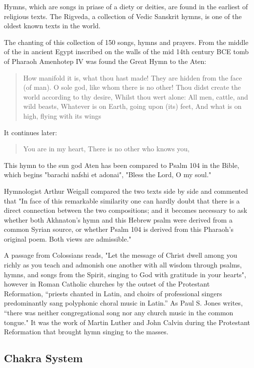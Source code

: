 \documentclass[12pt]{article}
\begin{document}
Hymns, which are songs in priase of a diety or deities, are found in the earliest of religious texts. The Rigveda, a collection of Vedic Sanskrit hymns, is one of the oldest known texts in the world.

The chanting of this collection of 150 songs, hymns and prayers. From the middle of the in ancient Egypt inscribed on the walls of the mid 14th century BCE tomb of Pharaoh Amenhotep IV was found the Great Hymn to the Aten:

\begin{quote}
How manifold it is, what thou hast made!
They are hidden from the face (of man).
O sole god, like whom there is no other!
Thou didst create the world according to thy desire,
Whilst thou wert alone: All men, cattle, and wild beasts,
Whatever is on Earth, going upon (its) feet,
And what is on high, flying with its wings
\end{quote}

It continues later:

\begin{quote}
You are in my heart,
There is no other who knows you,
\end{quote}

This hymn to the sun god Aten has been compared to Psalm 104 in the Bible, which begins "barachi nafshi et adonai", "Bless the Lord, O my soul."

Hymnologist Arthur Weigall compared the two texts side by side and commented that "In face of this remarkable similarity one can hardly doubt that there is a direct connection between the two compositions; and it becomes necessary to ask whether both Akhnaton's hymn and this Hebrew psalm were derived from a common Syrian source, or whether Psalm 104 is derived from this Pharaoh's original poem. Both views are admissible."

A passage from Colossians reads, "Let the message of Christ dwell among you richly as you teach and admonish one another with all wisdom through psalms, hymns, and songs from the Spirit, singing to God with gratitude in your hearts", however in Roman Catholic churches by the outset of the Protestant Reformation, “priests chanted in Latin, and choirs of professional singers predominantly sang polyphonic choral music in Latin.” As Paul S. Jones writes, “there was neither congregational song nor any church music in the common tongue." It was the work of Martin Luther and John Calvin during the Protestant Reformation that brought hymn singing to the masses.


\subsection*{Chakra System}
\end{document}

